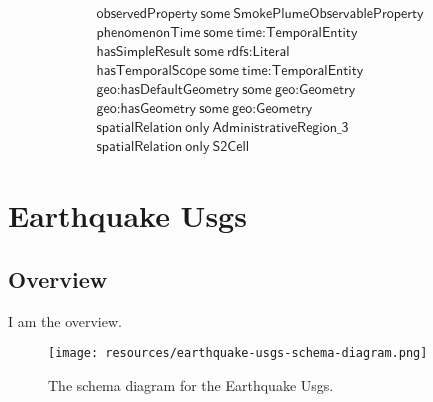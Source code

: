\begin{align}
  \textsf{observedProperty}~\textsf{some}~\textsf{SmokePlumeObservableProperty}\\
  \textsf{phenomenonTime}~\textsf{some}~\textsf{time:TemporalEntity}\\
  \textsf{hasSimpleResult}~\textsf{some}~\textsf{rdfs:Literal}\\
  \textsf{hasTemporalScope}~\textsf{some}~\textsf{time:TemporalEntity}\\
  \textsf{geo:hasDefaultGeometry}~\textsf{some}~\textsf{geo:Geometry}\\
  \textsf{geo:hasGeometry}~\textsf{some}~\textsf{geo:Geometry}\\
  \textsf{spatialRelation}~\textsf{only}~\textsf{AdministrativeRegion\_3}\\
  \textsf{spatialRelation}~\textsf{only}~\textsf{S2Cell}\end{align}



\section{Earthquake Usgs}
\label{sec:earthquake-usgs}
\subsection{Overview}
\label{ssec:overview}

I am the overview.

\begin{figure}[h!]
  \begin{center}
    \texttt{[image: resources/earthquake-usgs-schema-diagram.png]}
  \end{center}
  \caption{The schema diagram for the Earthquake Usgs.}
  \label{fig:ov-diagram}
\end{figure}



